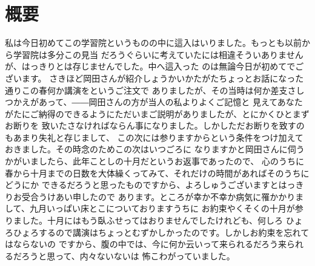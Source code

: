 \chapter{概要}
私は今日初めてこの学習院というものの中に這入はいりました。もっとも以前から学習院は多分この見当
だろうぐらいに考えていたには相違そういありませんが、はっきりとは存じませんでした。中へ這入った
のは無論今日が初めてでございます。
さきほど岡田さんが紹介しょうかいかたがたちょっとお話になった通りこの春何か講演をというご注文で
ありましたが、その当時は何か差支さしつかえがあって、――岡田さんの方が当人の私よりよくご記憶と
見えてあなたがたにご納得のできるようにただいまご説明がありましたが、とにかくひとまずお断りを
致いたさなければならん事になりました。しかしただお断りを致すのもあまり失礼と存じまして、
この次には参りますからという条件をつけ加えておきました。その時念のためこの次はいつごろに
なりますかと岡田さんに伺うかがいましたら、此年ことしの十月だというお返事であったので、
心のうちに春から十月までの日数を大体繰くってみて、それだけの時間があればそのうちにどうにか
できるだろうと思ったものですから、よろしゅうございますとはっきりお受合うけあい申したので
あります。ところが幸か不幸か病気に罹かかりまして、九月いっぱい床とこについておりますうちに
お約束やくそくの十月が参りました。十月にはもう臥ふせってはおりませんでしたけれども、何しろ
ひょろひょろするので講演はちょっとむずかしかったのです。しかしお約束を忘れてはならないの
ですから、腹の中では、今に何か云いって来られるだろう来られるだろうと思って、内々ないないは
怖こわがっていました。
